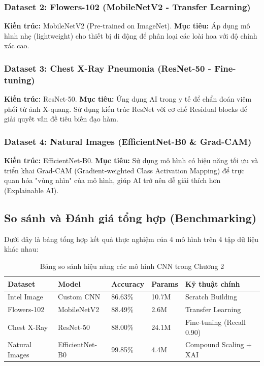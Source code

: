 \subsubsection{Dataset 2: Flowers-102 (MobileNetV2 - Transfer Learning)}
\textbf{Kiến trúc:} MobileNetV2 (Pre-trained on ImageNet).
\textbf{Mục tiêu:} Áp dụng mô hình nhẹ (lightweight) cho thiết bị di động để phân loại các loài hoa với độ chính xác cao.


\subsubsection{Dataset 3: Chest X-Ray Pneumonia (ResNet-50 - Fine-tuning)}
\textbf{Kiến trúc:} ResNet-50.
\textbf{Mục tiêu:} Ứng dụng AI trong y tế để chẩn đoán viêm phổi từ ảnh X-quang. Sử dụng kiến trúc ResNet với cơ chế Residual blocks để giải quyết vấn đề tiêu biến đạo hàm.


\subsubsection{Dataset 4: Natural Images (EfficientNet-B0 \& Grad-CAM)}
\textbf{Kiến trúc:} EfficientNet-B0.
\textbf{Mục tiêu:} Sử dụng mô hình có hiệu năng tối ưu và triển khai Grad-CAM (Gradient-weighted Class Activation Mapping) để trực quan hóa "vùng nhìn" của mô hình, giúp AI trở nên dễ giải thích hơn (Explainable AI).


\subsection{So sánh và Đánh giá tổng hợp (Benchmarking)}
Dưới đây là bảng tổng hợp kết quả thực nghiệm của 4 mô hình trên 4 tập dữ liệu khác nhau:

\begin{table}[H]
    \centering
    \begin{tabular}{|l|l|l|l|l|}
    \hline
    \textbf{Dataset} & \textbf{Model} & \textbf{Accuracy} & \textbf{Params} & \textbf{Kỹ thuật chính} \\ \hline
    Intel Image & Custom CNN & 86.63\% & 10.7M & Scratch Building \\ \hline
    Flowers-102 & MobileNetV2 & 88.49\% & 2.6M & Transfer Learning \\ \hline
    Chest X-Ray & ResNet-50 & 88.00\% & 24.1M & Fine-tuning (Recall 0.90) \\ \hline
    Natural Images & EfficientNet-B0 & 99.85\% & 4.4M & Compound Scaling + XAI \\ \hline
    \end{tabular}
    \caption{Bảng so sánh hiệu năng các mô hình CNN trong Chương 2}
    \label{tab:cnn_comparison}
\end{table}

